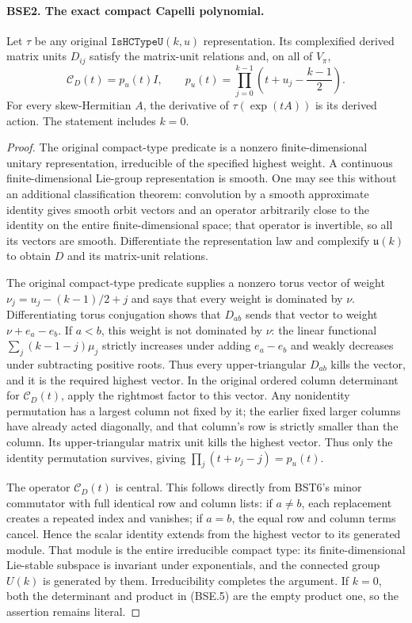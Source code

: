 \paragraph{BSE2. The exact compact Capelli polynomial.}
\label{claim:BSE2}
Let $\tau$ be any original $\texttt{IsHCTypeU}(k,u)$ representation.
Its complexified derived matrix units $D_{ij}$ satisfy the
matrix-unit relations and, on all of $V_\pi$,
\[
 \mathcal C_D(t)=p_u(t)I,\qquad
 p_u(t)=\prod_{j=0}^{k-1}
               \left(t+u_j-\frac{k-1}{2}\right).
 \tag{BSE.5}
\]
For every skew-Hermitian $A$, the derivative of
$\tau(\exp(tA))$ is its derived action.  The statement includes $k=0$.

\begin{proof}
The original compact-type predicate is a nonzero finite-dimensional
unitary representation, irreducible of the specified highest weight.
A continuous finite-dimensional Lie-group representation is smooth.
One may see this without an additional classification theorem:
convolution by a smooth approximate identity gives smooth orbit
vectors and an operator arbitrarily close to the identity on the
entire finite-dimensional space; that operator is invertible,
so all its vectors are smooth.  Differentiate the representation
law and complexify $\mathfrak u(k)$ to obtain $D$ and its
matrix-unit relations.

The original compact-type predicate supplies a nonzero torus
vector of weight $\nu_j=u_j-(k-1)/2+j$ and says that every weight
is dominated by $\nu$.  Differentiating torus conjugation shows
that $D_{ab}$ sends that vector to weight $\nu+e_a-e_b$.
If $a<b$, this weight is not dominated by $\nu$: the linear
functional $\sum_j(k-1-j)\mu_j$ strictly increases under adding
$e_a-e_b$ and weakly decreases under subtracting positive roots.
Thus every upper-triangular $D_{ab}$ kills the vector, and it is
the required highest vector.
In the original ordered column determinant
for $\mathcal C_D(t)$, apply the rightmost factor to this vector.
Any nonidentity permutation has a largest column not fixed by it;
the earlier fixed larger columns have already acted diagonally, and
that column's row is strictly smaller than the column.  Its
upper-triangular matrix unit kills the highest vector.  Thus only
the identity permutation survives, giving
$\prod_j(t+\nu_j-j)=p_u(t)$.

The operator $\mathcal C_D(t)$ is central.  This follows directly
from BST6's minor commutator with full identical row and column
lists: if $a\ne b$, each replacement creates a repeated index and
vanishes; if $a=b$, the equal row and column terms cancel.
Hence the scalar identity extends from the highest vector to its
generated module.  That module is the entire irreducible compact
type: its finite-dimensional Lie-stable subspace is invariant
under exponentials, and the connected group $U(k)$ is generated
by them.  Irreducibility completes the argument.
If $k=0$, both the determinant and product in (BSE.5) are the
empty product one, so the assertion remains literal.
\end{proof}


